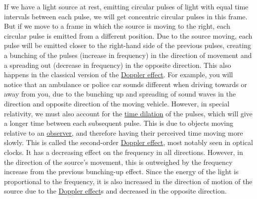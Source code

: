 If we have a light source at rest, emitting circular pulses of light with equal time intervals between each pulse, we will get concentric circular pulses in this frame.
But if we move to a frame in which the source is moving to the right, each circular pulse is emitted from a different position.
Due to the source moving, each pulse will be emitted closer to the right-hand side of the previous pulses, creating a bunching of the pulses (increase in frequency) in the direction of movement and a spreading out (decrease in frequency) in the opposite direction.
This also happens in the classical version of the \hyperlink{def-doppler-effect}{Doppler effect}.
For example, you will notice that an ambulance or police car sounds different when driving towards or away from you, due to the bunching up and spreading of sound waves in the direction and opposite direction of the moving vehicle.
However, in special relativity, we must also account for the \hyperlink{def-time-dilation}{time dilation} of the pulses, which will give a longer time between each subsequent pulse.
This is due to objects moving relative to an \hyperlink{def-observer}{observer}, and therefore having their perceived time moving more slowly.
This is called the second-order \hyperlink{def-doppler-effect}{Doppler effect}, most notably seen in optical clocks.
It has a decreasing effect on the frequency in all directions.
However, in the direction of the source's movement, this is outweighed by the frequency increase from the previous bunching-up effect.
Since the energy of the light is proportional to the frequency, it is also increased in the direction of motion of the source due to the \hyperlink{def-doppler-effect}{Doppler effect}s and decreased in the opposite direction.

